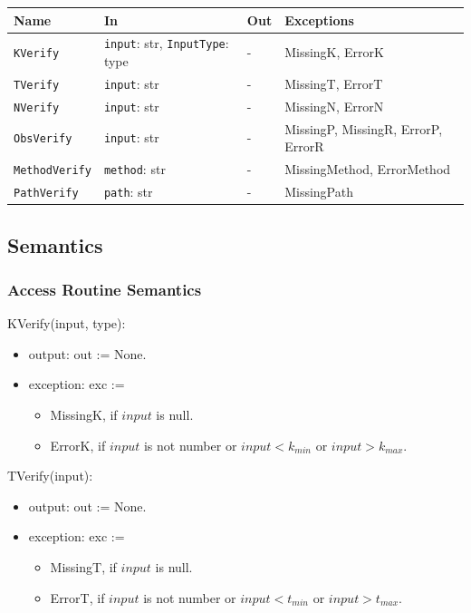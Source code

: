 \documentclass[12pt, titlepage]{article}
\begin{document}
\begin{center}
\begin{tabular}{p{4cm} p{4cm} p{4cm} p{2cm}}
\hline
\textbf{Name} & \textbf{In} & \textbf{Out} & \textbf{Exceptions} \\
\hline
\texttt{KVerify} & \texttt{input}: str, \texttt{InputType}: type & - & MissingK, ErrorK \\
\texttt{TVerify} & \texttt{input}: str & - & MissingT, ErrorT \\
\texttt{NVerify} & \texttt{input}: str & - & MissingN, ErrorN \\
\texttt{ObsVerify} & \texttt{input}: str & - & MissingP, MissingR, ErrorP, ErrorR \\
\texttt{MethodVerify} & \texttt{method}: str & - & MissingMethod, ErrorMethod \\
\texttt{PathVerify} & \texttt{path}: str & - & MissingPath \\
\hline
\end{tabular}
\end{center}

\subsection{Semantics}

\subsubsection{Access Routine Semantics}

\noindent KVerify(input, type):
\begin{itemize}
\item output: out := None. 
\item exception: exc :=
\begin{itemize}
  \item MissingK, if $input$ is null.
  \item ErrorK, if $input$ is not number or $input < k_{min}$ or $input > k_{max}$.
\end{itemize}
\end{itemize}

\noindent TVerify(input):
\begin{itemize}
\item output: out := None. 
\item exception: exc :=
\begin{itemize}
  \item MissingT, if $input$ is null.
  \item ErrorT, if $input$ is not number or $input < t_{min}$ or $input > t_{max}$.
\end{itemize}
\end{itemize}
\end{document}
